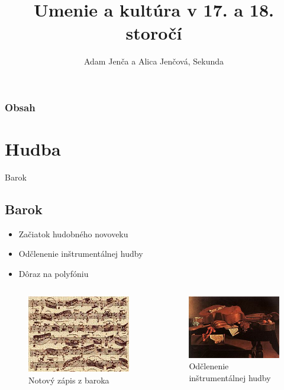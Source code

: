 \documentclass[dvipsnames]{beamer}
\title{Umenie a kultúra v 17. a 18. storočí}
\author{Adam Jenča a  Alica Jenčová, Sekunda}
\begin{document}
\begin{frame}
	\titlepage
\end{frame}
\begin{frame}
	\frametitle {Obsah}
	\begin{multicols}{2}
		\tableofcontents
	\end{multicols}
\end{frame}
\section{Hudba}
\frame{\sectionpage}
\begin{frame}{Barok}
	\subsection{Barok}
	\begin{itemize}
		\item Začiatok hudobného novoveku
		\item Odčlenenie inštrumentálnej hudby
		\item Dôraz na polyfóniu
	\end{itemize}
	\begin{columns}

		\kern0pt
		\begin{figure}
			\includegraphics[scale=1.5]{baroko}
			\caption{Notový zápis z baroka}
		\end{figure}%

		\begin{figure}
			\includegraphics[scale=1.5]{in}
			\caption{Odčlenenie inštrumentálnej hudby}
		\end{figure}
	\end{columns}

\end{frame}
\end{document}
